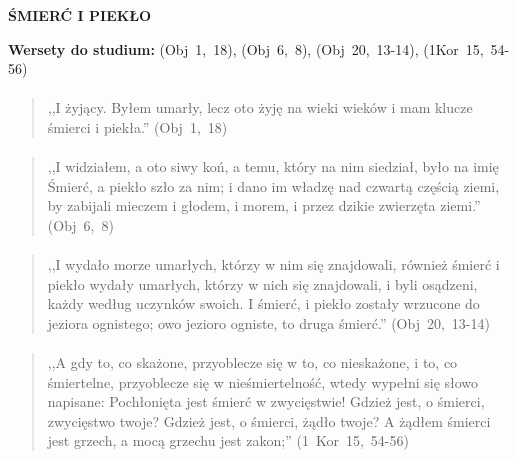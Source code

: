 \documentclass[10pt,a4paper,oneside]{article}
\begin{document}
\centerline{\textbf{\MakeUppercase{Śmierć i Piekło}}}
\begin{center}
\textbf{Wersety do studium:} 
\mbox{(Obj 1, 18)}, \mbox{(Obj 6, 8)}, \mbox{(Obj 20, 13-14)}, \mbox{(1Kor 15, 54-56)}
\end{center}
\paragraph{}
\begin{quote}
,,I żyjący. Byłem umarły, lecz oto żyję na wieki wieków i mam klucze śmierci i piekła.'' \mbox{(Obj 1, 18)}
\end{quote}
\paragraph{}
\begin{quote}
,,I widziałem, a oto siwy koń, a temu, który na nim siedział, było na imię Śmierć, a piekło szło za nim; i dano im władzę nad czwartą częścią ziemi, by zabijali mieczem i głodem, i morem, i przez dzikie zwierzęta ziemi.'' \mbox{(Obj 6, 8)}
\end{quote}
\paragraph{}
\begin{quote}
,,I wydało morze umarłych, którzy w nim się znajdowali, również śmierć i piekło wydały umarłych, którzy w nich się znajdowali, i byli osądzeni, każdy według uczynków swoich. I śmierć, i piekło zostały wrzucone do jeziora ognistego; owo jezioro ogniste, to druga śmierć.'' \mbox{(Obj 20, 13-14)}
\end{quote}
\paragraph{}
\begin{quote}
,,A gdy to, co skażone, przyoblecze się w to, co nieskażone, i to, co śmiertelne, przyoblecze się w nieśmiertelność, wtedy wypełni się słowo napisane: Pochłonięta jest śmierć w zwycięstwie! Gdzież jest, o śmierci, zwycięstwo twoje? Gdzież jest, o śmierci, żądło twoje? A żądłem śmierci jest grzech, a mocą grzechu jest zakon;'' \mbox{(1 Kor 15, 54-56)}
\end{quote}
\end{document}
